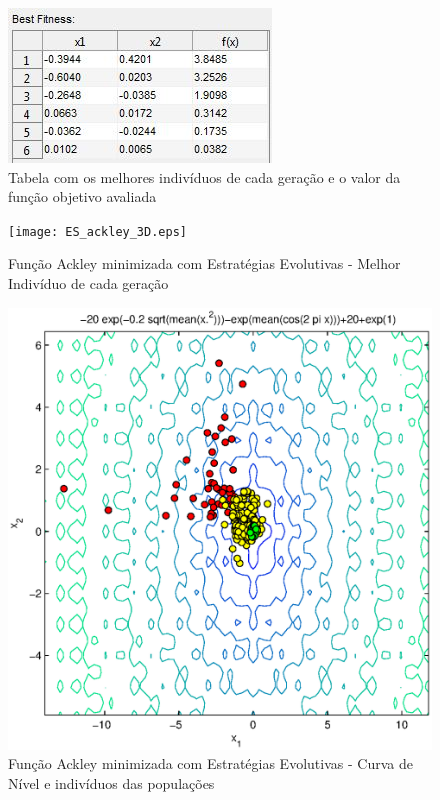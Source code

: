 \documentclass[conference,compsoc]{IEEEtran}
\begin{document}
\begin{figure}[!htcb]
\centering
\includegraphics[scale=0.55]{ES_ackley_table.jpg}
\caption{Tabela com os melhores indivíduos de cada geração e o valor da função objetivo avaliada}
\label{fig:table}
\end{figure}


\begin{figure}[!htcb]
\centering
\texttt{[image: ES\_ackley\_3D.eps]}
\caption{Função Ackley minimizada com Estratégias Evolutivas - Melhor Indivíduo de cada geração}
\label{fig:ES_ackley_3D}
\end{figure}

\begin{figure}[!htcb]
\centering
\includegraphics[scale=0.55]{ES_ackley_curvNivel.eps}
\caption{Função Ackley minimizada com Estratégias Evolutivas - Curva de Nível e indivíduos das populações}
\label{fig:ES_ackley_curvNivel}
\end{figure}
\end{document}
